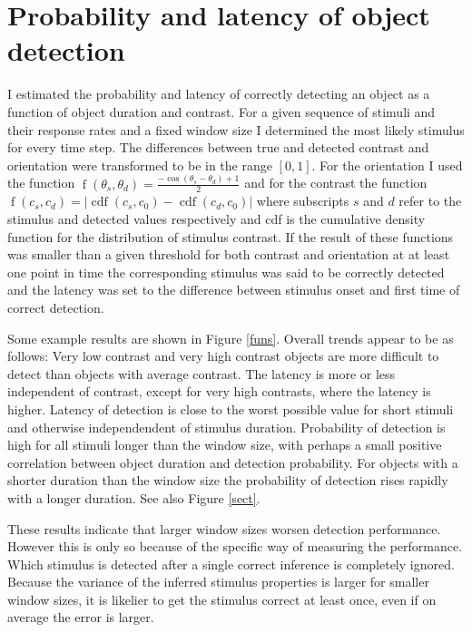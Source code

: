 \documentclass{scrartcl}
\begin{document}
\section{Probability and latency of object detection}

I estimated the probability and latency of correctly detecting an object as a function of object duration and contrast. For a given sequence of stimuli and their response rates and a fixed window size I determined the most likely stimulus for every time step. The differences between true and detected contrast and orientation were transformed to be in the range $\left[0, 1\right]$. For the orientation I used the function $\operatorname{f}(\theta_s, \theta_d) = \frac{- \cos{(\theta_s - \theta_d)} + 1}{2}$ and for the contrast the function $\operatorname{f}(c_s, c_d) = \lvert \operatorname{cdf}(c_s, c_0) - \operatorname{cdf}(c_d, c_0) \rvert $ where subscripts $s$ and $d$ refer to the stimulus and detected values respectively and cdf is the cumulative density function for the distribution of stimulus contrast. If the result of these functions was smaller than a given threshold for both contrast and orientation at at least one point in time the corresponding stimulus was said to be correctly detected and the latency was set to the difference between stimulus onset and first time of correct detection.

Some example results are shown in Figure \ref{funs}. Overall trends appear to be as follows: Very low contrast and very high contrast objects are more difficult to detect than objects with average contrast. The latency is more or less independent of contrast, except for very high contrasts, where the latency is higher. Latency of detection is close to the worst possible value for short stimuli and otherwise independendent of stimulus duration. Probability of detection is high for all stimuli longer than the window size, with perhaps a small positive correlation between object duration and detection probability. For objects with a shorter duration than the window size the probability of detection rises rapidly with a longer duration. See also Figure \ref{sect}.

These results indicate that larger window sizes worsen detection performance. However this is only so because of the specific way of measuring the performance. Which stimulus is detected after a single correct inference is completely ignored. Because the variance of the inferred stimulus properties is larger for smaller window sizes, it is likelier to get the stimulus correct at least once, even if on average the error is larger.
\end{document}
